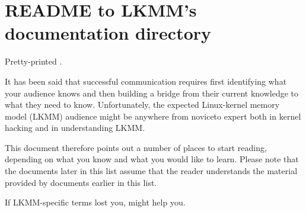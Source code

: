 \section{README to LKMM's documentation directory}

\begin{Note}
  Pretty-printed .
\end{Note}

It has been said that successful communication requires first identifying
what your audience knows and then building a bridge from their current
knowledge to what they need to know.
Unfortunately, the expected Linux-kernel memory model (LKMM) audience
might be anywhere from noviceto expert both in kernel hacking and in
understanding LKMM.

This document therefore points out a number of places to start reading,
depending on what you know and what you would like to learn.
Please note that the documents later in this list assume that the reader
understands the material provided by documents earlier in this list.

If LKMM-specific terms lost you,  might help you.

